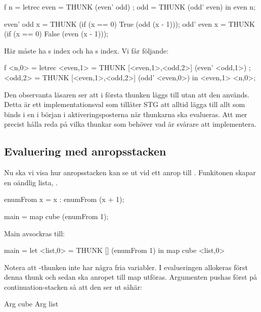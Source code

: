 \documentclass[../Core]{subfiles}
\begin{document}
\begin{codeEx}
f n = letrec 
    { even = THUNK (even' odd)
    ; odd  = THUNK (odd' even)
    } in even n;
    
even' odd x = THUNK (if (x == 0) True  (odd  (x - 1)));
odd' even x = THUNK (if (x == 0) False (even (x - 1)));
\end{codeEx}

Här måste  ha s index och  ha s index. Vi får följande:

\begin{codeEx}
f <n,0> = letrec 
    { <even,1> = THUNK [<even,1>,<odd,2>] (even' <odd,1>)
    ; <odd,2>  = THUNK [<even,1>,<odd,2>] (odd' <even,0>)
    } in <even,1> <n,0>;
\end{codeEx}

Den observanta läsaren ser att i första thunken läggs  till utan att den används. 
Detta är ett implementationsval som tillåter STG att alltid lägga till allt som 
binds i en  i början i aktiveringsposterna när thunkarna ska evalueras. 
Att mer precist hålla reda på vilka thunkar som behöver vad är svårare att implementera.




\subsection{Evaluering med anropsstacken}



Nu ska vi visa hur anropsstacken kan se ut vid ett anrop till .
Funkitonen  skapar en oändlig lista, \ic{[x, x+1, x+2, ...]}.
 
\begin{codeEx}
enumFrom x = x : enumFrom (x + 1);

main = map cube (enumFrom 1);
\end{codeEx}

Main avsockras till:
\begin{codeEx}
main = let <list,0> = THUNK [] (enumFrom 1)
       in  map cube <list,0>
\end{codeEx}



Notera att -thunken inte har några fria variabler.
I evalueringen allokeras först denna thunk och sedan ska anropet till map
utföras. 
Argumenten pushas först på continuation-stacken så att den ser ut såhär:
\begin{codeEx}
Arg cube
Arg list
\end{codeEx}
\end{document}
